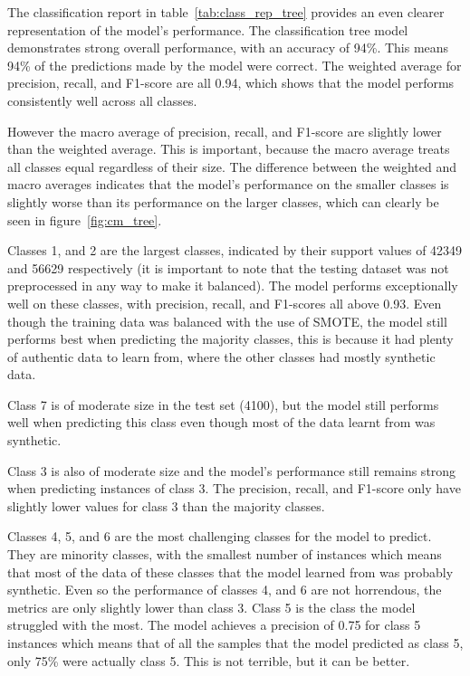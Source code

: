 \documentclass[conference]{IEEEtran}
\begin{document}
The classification report in table~\ref{tab:class_rep_tree} provides an even clearer representation of the model's performance. The classification tree model demonstrates strong overall performance, with an accuracy of 94\%. This means 94\% of the predictions made by the model were correct. The weighted average for precision, recall, and F1-score are all 0.94, which shows that the model performs consistently well across all classes.

However the macro average of precision, recall, and F1-score are slightly lower than the weighted average. This is important, because the macro average treats all classes equal regardless of their size. The difference between the weighted and macro averages indicates that the model's performance on the smaller classes is slightly worse than its performance on the larger classes, which can clearly be seen in figure~\ref{fig:cm_tree}.

Classes 1, and 2 are the largest classes, indicated by their support values of 42349 and 56629 respectively (it is important to note that the testing dataset was not preprocessed in any way to make it balanced). The model performs exceptionally well on these classes, with precision, recall, and F1-scores all above 0.93. Even though the training data was balanced with the use of SMOTE, the model still performs best when predicting the majority classes, this is because it had plenty of authentic data to learn from, where the other classes had mostly synthetic data.

Class 7 is of moderate size in the test set (4100), but the model still performs well when predicting this class even though most of the data learnt from was synthetic.

Class 3 is also of moderate size and the model's performance still remains strong when predicting instances of class 3. The precision, recall, and F1-score only have slightly lower values for class 3 than the majority classes.

Classes 4, 5, and 6 are the most challenging classes for the model to predict. They are minority classes, with the smallest number of instances which means that most of the data of these classes that the model learned from was probably synthetic. Even so the performance of classes 4, and 6 are not horrendous, the metrics are only slightly lower than class 3. Class 5 is the class the model struggled with the most. The model achieves a precision of 0.75 for class 5 instances which means that of all the samples that the model predicted as class 5, only 75\% were actually class 5. This is not terrible, but it can be better.
\end{document}
